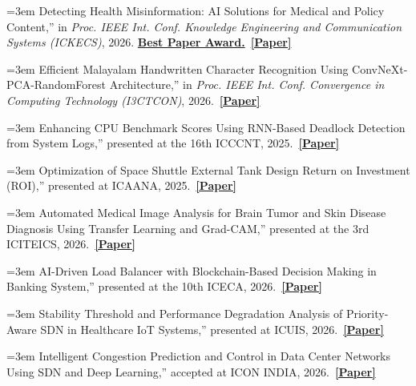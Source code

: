 \documentclass[letterpaper,10.8pt]{article}
\newcommand{\resumeItemPublication}[2]{
  \item\footnotesize{\rightskip=0pt\relax\emergencystretch=3em\leavevmode
    #1\unskip~\mbox{#2}\par
  }
}
\begin{document}
  \resumeItemPublication{Detecting Health Misinformation: AI Solutions for Medical and Policy Content,'' in \textit{Proc. IEEE Int. Conf. Knowledge Engineering and Communication Systems (ICKECS)}, 2026. \textbf{\href{https://github.com/VIBHAS777/research-papers/blob/main/13-Detecting-Health-Misinformation-AI-Solutions/Best_Paper_Award_ICKECS_2026.pdf}{Best Paper Award.}}}
  {\textbf{\href{https://ieeexplore.ieee.org/document/11528010}{[Paper]}}}

  \resumeItemPublication{Efficient Malayalam Handwritten Character Recognition Using ConvNeXt-PCA-RandomForest Architecture,'' in \textit{Proc. IEEE Int. Conf. Convergence in Computing Technology (I3CTCON)}, 2026.}
  {\textbf{\href{https://ieeexplore.ieee.org/document/11507971}{[Paper]}}}

  \resumeItemPublication{Enhancing CPU Benchmark Scores Using RNN-Based Deadlock Detection from System Logs,'' presented at the 16th ICCCNT, 2025.}
  {\textbf{\href{https://github.com/VIBHAS777/research-papers/tree/main/05-RNN-Based-Deadlock-Detection}{[Paper]}}}

  \resumeItemPublication{Optimization of Space Shuttle External Tank Design Return on Investment (ROI),'' presented at ICAANA, 2025.}
  {\textbf{\href{https://github.com/VIBHAS777/research-papers/blob/main/06-Space-Shuttle-External-Tank-ROI/Optimization_of_Space_Shuttle_External_Tank_Design_ROI.pdf}{[Paper]}}}

  \resumeItemPublication{Automated Medical Image Analysis for Brain Tumor and Skin Disease Diagnosis Using Transfer Learning and Grad-CAM,'' presented at the 3rd ICITEICS, 2026.}
  {\textbf{\href{https://github.com/VIBHAS777/research-papers/tree/main/07-Automated-Medical-Image-Analysis-Grad-CAM}{[Paper]}}}

  \resumeItemPublication{AI-Driven Load Balancer with Blockchain-Based Decision Making in Banking System,'' presented at the 10th ICECA, 2026.}
  {\textbf{\href{https://github.com/VIBHAS777/research-papers/tree/main/08-AI-Driven-Load-Balancer-Banking}{[Paper]}}}

  \resumeItemPublication{Stability Threshold and Performance Degradation Analysis of Priority-Aware SDN in Healthcare IoT Systems,'' presented at ICUIS, 2026.}
  {\textbf{\href{https://github.com/VIBHAS777/research-papers/tree/main/09-Priority-Aware-SDN-Healthcare-IoT}{[Paper]}}}

  \resumeItemPublication{Intelligent Congestion Prediction and Control in Data Center Networks Using SDN and Deep Learning,'' accepted at ICON INDIA, 2026.}
  {\textbf{\href{https://github.com/VIBHAS777/research-papers/tree/main/10-SDN-Deep-Learning-Congestion-Control}{[Paper]}}}
\end{document}
